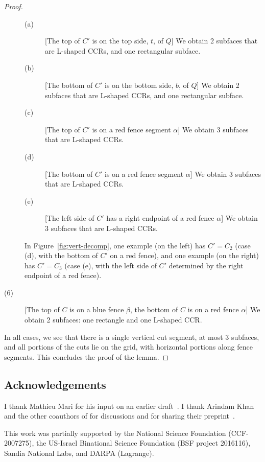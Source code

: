 \documentclass{article}
\begin{document}
\begin{proof}
\begin{description}
  \begin{description}
  \item[(a)] [The top of $C'$ is on the top side, $t$, of $Q$] We obtain 2 subfaces
      that are L-shaped CCRs, and one rectangular subface.
  \item[(b)] [The bottom of $C'$ is on the bottom side, $b$, of $Q$] We obtain 2 subfaces
      that are L-shaped CCRs, and one rectangular subface.
  \item[(c)] [The top of $C'$ is on a red fence segment $\alpha$] We obtain 3 subfaces
      that are L-shaped CCRs.
  \item[(d)] [The bottom of $C'$ is on a red fence segment $\alpha$] We obtain 3 subfaces
      that are L-shaped CCRs.
  \item[(e)] [The left side of $C'$ has a right endpoint of a red fence $\alpha$] We obtain 3 subfaces
      that are L-shaped CCRs.
  \end{description}
  In Figure~\ref{fig:vert-decomp}, one example (on the left) has
  $C'=C_2$ (case (d), with the bottom of $C'$ on a red fence), and one
  example (on the right) has $C'=C_3$ (case (e), with the left side of
  $C'$ determined by the right endpoint of a red fence).

\item[(6)] [The top of $C$ is on a blue fence $\beta$, the bottom of $C$ is on a red fence $\alpha$]
  We obtain 2 subfaces: one rectangle and one L-shaped CCR.

    \end{description}

In all cases, we see that there is a single vertical cut segment, at
most 3 subfaces, and all portions of the cuts lie on the grid, with
horizontal portions along fence segments.  This concludes the proof of
the lemma.
\end{proof}






\subsection*{Acknowledgements}
I thank
Mathieu Mari for his input on an earlier draft~\cite{DBLP:journals/corr/abs-2101-00326}. I thank Arindam Khan and the other coauthors of
\cite{galvez20214approximation} for discussions and for sharing their preprint~\cite{galvez2021-3approximation}.

This work was partially supported by the National Science Foundation
(CCF-2007275), the US-Israel Binational Science Foundation (BSF
project 2016116), Sandia National Labs, and DARPA (Lagrange).


%

\end{document}
